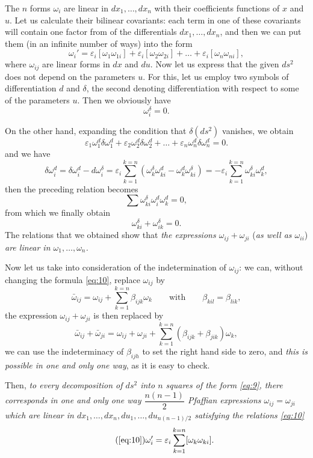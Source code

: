 \documentclass[leqno,12pt]{article}
\makeatletter
\let\old@epsilon\epsilon
\let\old@varepsilon\varepsilon
\let\epsilon\old@varepsilon
\let\varepsilon\old@epsilon
\theoremstyle{shape1}
\theoremstyle{shape0}
\theoremstyle{shape2}
\theoremstyle{definition}
\makeatother
\begin{document}
The $n$ forms $\omega_{i}$ are linear in $dx_{1},\dots,dx_{n}$ with their coefficients functions of $x$ and $u$. Let us calculate their bilinear covariants:  each term in one of these covariants will contain one factor from of the differentials $dx_{1},\dots,dx_{n}$, and then we can put them (in an infinite number of ways) into the form
\begin{equation}
  \label{eq:10}
  \omega_{i}'=\epsilon_{i}[\omega_{1}\omega_{1i}]+\epsilon_{i}[\omega_{2}\omega_{2i}]+\dots+\epsilon_{i}[\omega_{n}\omega_{ni}],
\end{equation}
where $\omega_{ij}$ are linear forms in $dx$ and $du$. Now let us express that the given $ds^{2}$ does not depend on the parameters $u$. For this, let us employ two symbols of differentiation $d$ and $\delta$, the second denoting differentiation with respect to some of the parameters $u$. Then we obviously have
\[
\omega_{i}^{\delta}=0.
\]

On the other hand, expanding the condition that $\delta(ds^{2})$ vanishes, we obtain
\[
\epsilon_{1}\omega_{1}^{d}\delta\omega_{1}^{d}+
\epsilon_{2}\omega_{2}^{d}\delta\omega_{2}^{d}+
\dots+
\epsilon_{n}\omega_{n}^{d}\delta\omega_{n}^{d}=0.
\]
and we have
\[
\delta\omega_{i}^{d}=\delta\omega_{i}^{d}-d\omega_{i}^{\delta}=\epsilon_{i}\sum_{k=1}^{k=n}(\omega_{k}^{\delta}\omega_{ki}^{d}-\omega_{k}^{d}\omega_{ki}^{\delta})=-\epsilon_{i}\sum_{k=1}^{k=n}\omega_{ki}^{\delta}\omega_{k}^{d},
\]
then the preceding relation becomes
\[
\sum\omega_{ki}^{\delta}\omega_{i}^{d}\omega_{k}^{d}=0,
\]
from which we finally obtain
\[
\omega_{ki}^{\delta}+\omega_{ik}^{\delta}=0.
\]
The relations that we obtained show that \emph{the expressions $\omega_{ij}+\omega_{ji}$} (\emph{as well as $\omega_{ii}$}) \emph{are linear in $\omega_{1},\dots,\omega_{n}$.}

Now let us take into consideration of the indetermination of $\omega_{ij}$: we can, without changing the formula \eqref{eq:10}, replace $\omega_{ij}$ by
\[
\bar\omega_{ij}=\omega_{ij}+\sum_{k=1}^{k=n}\beta_{ijk}\omega_{k}\qquad\text{with}\qquad \beta_{kil}=\beta_{lik},
\]
the expression $\omega_{ij}+\omega_{ji}$ is then replaced by
\[
\bar \omega_{ij}+\bar \omega_{ji}=\omega_{ij}+\omega_{ji}+\sum_{k=1}^{k=n}(\beta_{ijk}+\beta_{jik})\omega_{k},
\]
we can use the indeterminacy of $\beta_{ijh}$ to set the right hand side to zero, and \emph{this is possible in one and only one way}, as it is easy to check.

Then, \emph{to every decomposition of $ds^{2}$ into $n$ squares of the form \eqref{eq:9}, there corresponds in one and only one way $\dfrac{n(n-1)}{2}$ Pfaffian expressions $\omega_{ij}=\omega_{ji}$ which are linear in $dx_{1},\dots,dx_{n},du_{1},\dots,du_{n(n-1)/2}$ satisfying the relations \eqref{eq:10}}
\begin{equation}
  \label{eq:10'}\tag{\ref{eq:10}}
  \omega_{i}'=\epsilon_{i}\sum_{k=1}^{k=n}[\omega_{k}\omega_{ki}].
\end{equation}
\end{document}
